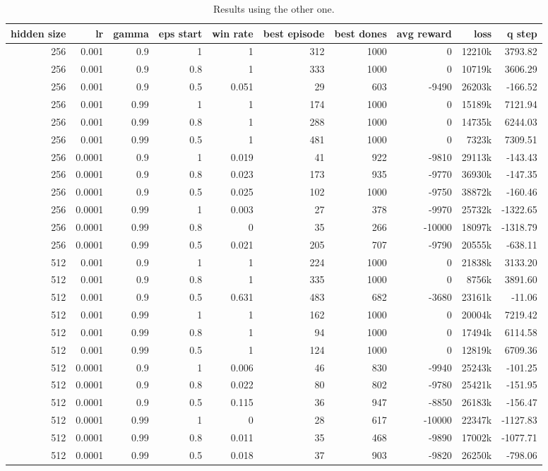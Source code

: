 \begin{table}
	\centering
	\scriptsize
	\begin{tabular}{r r r r | r r r r r r}
		\toprule
			hidden size & lr & gamma & eps start & win rate & best episode & best dones & avg reward & loss & q step \\
		\midrule
			256 & 0.001 & 0.9 & 1 & 1 & 312 & 1000 & 0 & 12210k & 3793.82 \\
			256 & 0.001 & 0.9 & 0.8 & 1 & 333 & 1000 & 0 & 10719k & 3606.29 \\
			256 & 0.001 & 0.9 & 0.5 & 0.051 & 29 & 603 & -9490 & 26203k & -166.52 \\
			256 & 0.001 & 0.99 & 1 & 1 & 174 & 1000 & 0 & 15189k & 7121.94 \\
			256 & 0.001 & 0.99 & 0.8 & 1 & 288 & 1000 & 0 & 14735k & 6244.03 \\
			256 & 0.001 & 0.99 & 0.5 & 1 & 481 & 1000 & 0 & 7323k & 7309.51 \\
			256 & 0.0001 & 0.9 & 1 & 0.019 & 41 & 922 & -9810 & 29113k & -143.43 \\
			256 & 0.0001 & 0.9 & 0.8 & 0.023 & 173 & 935 & -9770 & 36930k & -147.35 \\
			256 & 0.0001 & 0.9 & 0.5 & 0.025 & 102 & 1000 & -9750 & 38872k & -160.46 \\
			256 & 0.0001 & 0.99 & 1 & 0.003 & 27 & 378 & -9970 & 25732k & -1322.65 \\
			256 & 0.0001 & 0.99 & 0.8 & 0 & 35 & 266 & -10000 & 18097k & -1318.79 \\
			256 & 0.0001 & 0.99 & 0.5 & 0.021 & 205 & 707 & -9790 & 20555k & -638.11 \\
			512 & 0.001 & 0.9 & 1 & 1 & 224 & 1000 & 0 & 21838k & 3133.20 \\
			512 & 0.001 & 0.9 & 0.8 & 1 & 335 & 1000 & 0 & 8756k & 3891.60 \\
			512 & 0.001 & 0.9 & 0.5 & 0.631 & 483 & 682 & -3680 & 23161k & -11.06 \\
			512 & 0.001 & 0.99 & 1 & 1 & 162 & 1000 & 0 & 20004k & 7219.42 \\
			512 & 0.001 & 0.99 & 0.8 & 1 & 94 & 1000 & 0 & 17494k & 6114.58 \\
			512 & 0.001 & 0.99 & 0.5 & 1 & 124 & 1000 & 0 & 12819k & 6709.36 \\
			512 & 0.0001 & 0.9 & 1 & 0.006 & 46 & 830 & -9940 & 25243k & -101.25 \\
			512 & 0.0001 & 0.9 & 0.8 & 0.022 & 80 & 802 & -9780 & 25421k & -151.95 \\
			512 & 0.0001 & 0.9 & 0.5 & 0.115 & 36 & 947 & -8850 & 26183k & -156.47 \\
			512 & 0.0001 & 0.99 & 1 & 0 & 28 & 617 & -10000 & 22347k & -1127.83 \\
			512 & 0.0001 & 0.99 & 0.8 & 0.011 & 35 & 468 & -9890 & 17002k & -1077.71 \\
			512 & 0.0001 & 0.99 & 0.5 & 0.018 & 37 & 903 & -9820 & 26250k & -798.06 \\
		\bottomrule
	\end{tabular}
	\caption{Results using the other one.}
	\label{targetnetwork_results}
\end{table}

